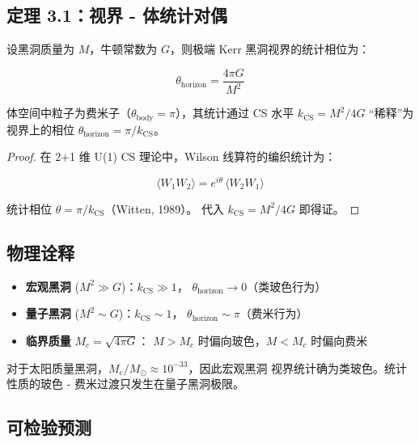 \documentclass[11pt,a4paper]{article}
\begin{document}
\subsection{定理 3.1：视界 - 体统计对偶}

\begin{theorem}[视界 - 体统计对偶]
设黑洞质量为 $M$，牛顿常数为 $G$，则极端 Kerr 黑洞视界的统计相位为：

\begin{equation}
\boxed{\theta_{\text{horizon}} = \frac{4\pi G}{M^2}}
\end{equation}

体空间中粒子为费米子（$\theta_{\text{body}} = \pi$），其统计通过
CS 水平 $k_{\text{CS}} = M^2/4G$ ``稀释''为视界上的相位
$\theta_{\text{horizon}} = \pi/k_{\text{CS}}$。
\end{theorem}

\begin{proof}
在 2+1 维 U(1) CS 理论中，Wilson 线算符的编织统计为：

\begin{equation}
\langle W_1 W_2 \rangle = e^{i\theta}\,\langle W_2 W_1 \rangle
\end{equation}

统计相位 $\theta = \pi/k_{\text{CS}}$（Witten, 1989）。
代入 $k_{\text{CS}} = M^2/4G$ 即得证。
\end{proof}

\subsection{物理诠释}

\begin{itemize}
\item \textbf{宏观黑洞} ($M^2 \gg G$)：$k_{\text{CS}} \gg 1$，
$\theta_{\text{horizon}} \to 0$（类玻色行为）
\item \textbf{量子黑洞} ($M^2 \sim G$)：$k_{\text{CS}} \sim 1$，
$\theta_{\text{horizon}} \sim \pi$（费米行为）
\item \textbf{临界质量} $M_c = \sqrt{4\pi G}$：
$M > M_c$ 时偏向玻色，$M < M_c$ 时偏向费米
\end{itemize}

对于太阳质量黑洞，$M_c/M_\odot \approx 10^{-33}$，因此宏观黑洞
视界统计确为类玻色。统计性质的玻色 - 费米过渡只发生在量子黑洞极限。

\subsection{可检验预测}
\end{document}
